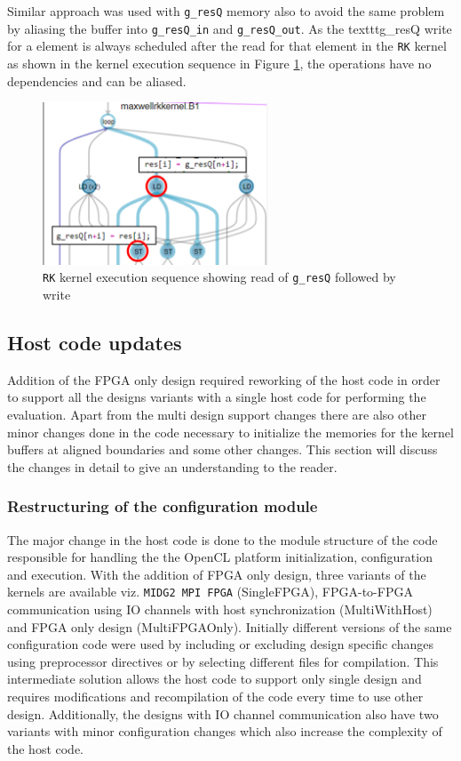 Similar approach was used with \texttt{g\_resQ} memory also to
avoid the same problem by aliasing the buffer into \texttt{g\_resQ\_in} and \texttt{g\_resQ\_out}.
As the texttt{g\_resQ} write for a element is always scheduled after the read for that element in the
\texttt{RK} kernel as shown in the kernel execution sequence in Figure \ref{fig:resQSeq},
the operations have no dependencies and can be aliased.
\begin{figure}[ht]%
    \centering
    \includegraphics[width=0.6\textwidth]{images/resgSeq}
    \caption{\texttt{RK} kernel execution sequence showing read of \texttt{g\_resQ} followed by
    write}
    \label{fig:resQSeq}
\end{figure}

\subsection{Host code updates}
\label{sec:hostcodeupdate}

Addition of the FPGA only design required reworking of the host code in order to
support all the designs variants with a single host code for performing the evaluation.
Apart from the multi design support changes there are also other minor changes done in the code necessary
to initialize the memories for the kernel buffers at aligned boundaries and some other
changes. This section will discuss the changes in detail to give an understanding
to the reader.

\subsubsection*{Restructuring of the configuration module}

The major change in the host code is done to the module structure of
the code responsible for handling the the OpenCL platform initialization,
configuration and execution. With the addition of FPGA only design,
three variants of the kernels are available viz. \texttt{MIDG2 MPI FPGA} (SingleFPGA),
FPGA-to-FPGA communication using IO channels with host synchronization (MultiWithHost)
and FPGA only design (MultiFPGAOnly). Initially different versions of the same
configuration code were used by including or excluding design specific changes
using preprocessor directives or by selecting different files for compilation.
This intermediate solution allows the host code to support only single design
and requires modifications and recompilation of the code every time to use other
design. Additionally, the designs with IO channel communication also have two variants
with minor configuration changes which also increase the complexity of the host code.

